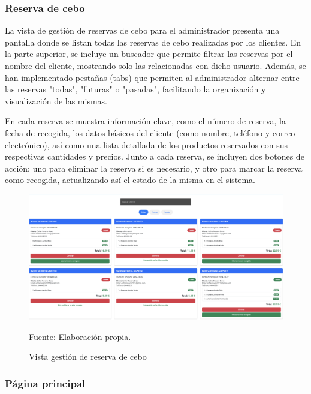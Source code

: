 \subsubsection{Reserva de cebo}\label{subsec5.1.2.2}
La vista de gestión de reservas de cebo para el administrador presenta una pantalla donde se listan todas las reservas de cebo realizadas por los clientes. En la parte superior, se incluye un buscador que permite filtrar las reservas por el nombre del cliente, mostrando solo las relacionadas con dicho usuario. Además, se han implementado pestañas (tabs) que permiten al administrador alternar entre las reservas "todas", "futuras" o "pasadas", facilitando la organización y visualización de las mismas.

\vspace{0.5cm}

En cada reserva se muestra información clave, como el número de reserva, la fecha de recogida, los datos básicos del cliente (como nombre, teléfono y correo electrónico), así como una lista detallada de los productos reservados con sus respectivas cantidades y precios. Junto a cada reserva, se incluyen dos botones de acción: uno para eliminar la reserva si es necesario, y otro para marcar la reserva como recogida, actualizando así el estado de la misma en el sistema.

\begin{figure}[H]
\begin{center}
\includegraphics[scale=0.30]{./Images/vistaAdminReservas.png}
\caption{Vista gestión de reserva de cebo} Fuente: Elaboración propia.

\label{fig:fig1}

\end{center}
\end{figure}


\subsubsection{Página principal}\label{subsec5.1.2.3}

